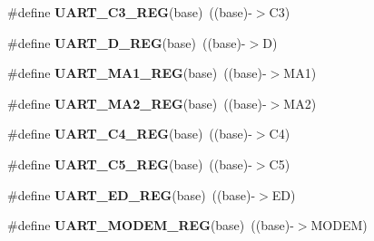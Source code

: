 \begin{DoxyCompactItemize}
\item 
\#define {\bfseries U\+A\+R\+T\+\_\+\+C3\+\_\+\+R\+EG}(base)~((base)-\/$>$C3)\hypertarget{group__UART__Register__Accessor__Macros_ga9a97319347f88dbd676dfa0c5b2bedae}{}\label{group__UART__Register__Accessor__Macros_ga9a97319347f88dbd676dfa0c5b2bedae}

\item 
\#define {\bfseries U\+A\+R\+T\+\_\+\+D\+\_\+\+R\+EG}(base)~((base)-\/$>$D)\hypertarget{group__UART__Register__Accessor__Macros_ga7ab320159fa5e0cf0d6526d0bd8ca27c}{}\label{group__UART__Register__Accessor__Macros_ga7ab320159fa5e0cf0d6526d0bd8ca27c}

\item 
\#define {\bfseries U\+A\+R\+T\+\_\+\+M\+A1\+\_\+\+R\+EG}(base)~((base)-\/$>$M\+A1)\hypertarget{group__UART__Register__Accessor__Macros_ga562badf54617cb122aede8a56bbbddb9}{}\label{group__UART__Register__Accessor__Macros_ga562badf54617cb122aede8a56bbbddb9}

\item 
\#define {\bfseries U\+A\+R\+T\+\_\+\+M\+A2\+\_\+\+R\+EG}(base)~((base)-\/$>$M\+A2)\hypertarget{group__UART__Register__Accessor__Macros_ga1d257c8ddd7eff316cefb8fd1b075a0c}{}\label{group__UART__Register__Accessor__Macros_ga1d257c8ddd7eff316cefb8fd1b075a0c}

\item 
\#define {\bfseries U\+A\+R\+T\+\_\+\+C4\+\_\+\+R\+EG}(base)~((base)-\/$>$C4)\hypertarget{group__UART__Register__Accessor__Macros_gaa13bbde4cda116273e3a2e1bc92bfa43}{}\label{group__UART__Register__Accessor__Macros_gaa13bbde4cda116273e3a2e1bc92bfa43}

\item 
\#define {\bfseries U\+A\+R\+T\+\_\+\+C5\+\_\+\+R\+EG}(base)~((base)-\/$>$C5)\hypertarget{group__UART__Register__Accessor__Macros_ga10c197f6ef00ae71cfd442f046ed8d00}{}\label{group__UART__Register__Accessor__Macros_ga10c197f6ef00ae71cfd442f046ed8d00}

\item 
\#define {\bfseries U\+A\+R\+T\+\_\+\+E\+D\+\_\+\+R\+EG}(base)~((base)-\/$>$ED)\hypertarget{group__UART__Register__Accessor__Macros_ga746dde7932b502b7a75bcc8100a7c750}{}\label{group__UART__Register__Accessor__Macros_ga746dde7932b502b7a75bcc8100a7c750}

\item 
\#define {\bfseries U\+A\+R\+T\+\_\+\+M\+O\+D\+E\+M\+\_\+\+R\+EG}(base)~((base)-\/$>$M\+O\+D\+EM)\hypertarget{group__UART__Register__Accessor__Macros_gaec51e80282719077408dac4dfc3d0ade}{}\label{group__UART__Register__Accessor__Macros_gaec51e80282719077408dac4dfc3d0ade}


\end{DoxyCompactItemize}
